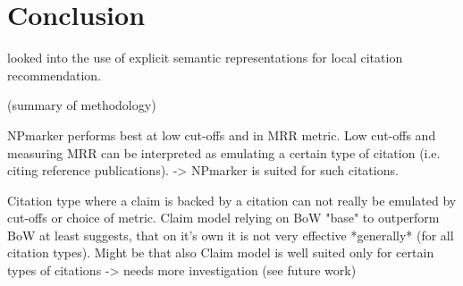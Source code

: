 \chapter{Conclusion}\label{chap:conclusion}
looked into the use of explicit semantic representations for local citation recommendation.

(summary of methodology)

NPmarker performs best at low cut-offs and in MRR metric. Low cut-offs and measuring MRR can be interpreted as emulating a certain type of citation (i.e. citing reference publications). -> NPmarker is suited for such citations.

Citation type where a claim is backed by a citation can not really be emulated by cut-offs or choice of metric. Claim model relying on BoW "base" to outperform BoW at least suggests, that on it's own it is not very effective *generally* (for all citation types). Might be that also Claim model is well suited only for certain types of citations -> needs more investigation (see future work)
